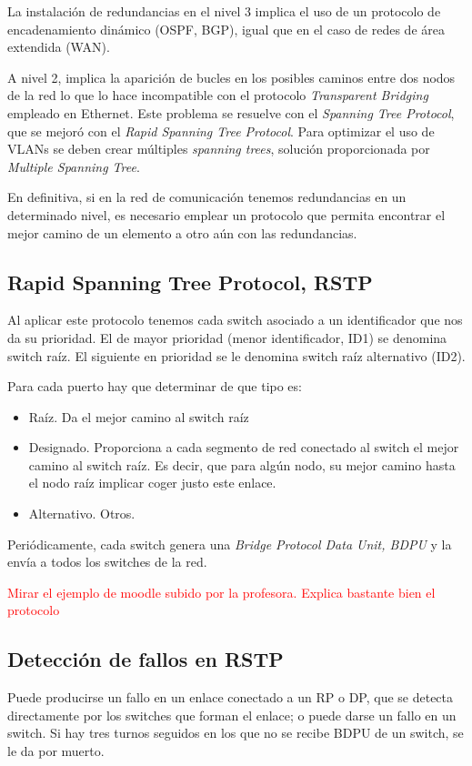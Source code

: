 La instalación de redundancias en el nivel 3 implica el uso de un protocolo de encadenamiento dinámico (OSPF, BGP), igual que en el caso de redes de área extendida (WAN).

A nivel 2, implica la aparición de bucles en los posibles caminos entre dos nodos de la red lo que lo hace incompatible con el protocolo \textit{Transparent Bridging} empleado en Ethernet. Este problema se resuelve con el \textit{Spanning Tree Protocol}, que se mejoró con el \textit{Rapid Spanning Tree Protocol}. Para optimizar el uso de VLANs se deben crear múltiples \textit{spanning trees}, solución proporcionada por \textit{Multiple Spanning Tree}.

En definitiva, si en la red de comunicación tenemos redundancias en un determinado nivel, es necesario emplear un protocolo que permita encontrar el mejor camino de un elemento a otro aún con las redundancias.

\subsection{Rapid Spanning Tree Protocol, RSTP}

Al aplicar este protocolo tenemos cada switch asociado a un identificador que nos da su prioridad. El de mayor prioridad (menor identificador, ID1) se denomina switch raíz. El siguiente en prioridad se le denomina switch raíz alternativo (ID2).

Para cada puerto hay que determinar de que tipo es:
\begin{itemize}
\item Raíz. Da el mejor camino al switch raíz

\item Designado. Proporciona a cada segmento de red conectado al switch el mejor camino al switch raíz. Es decir, que para algún nodo, su mejor camino hasta el nodo raíz implicar coger justo este enlace.

\item Alternativo. Otros.
\end{itemize}

Periódicamente, cada switch genera una \textit{Bridge Protocol Data Unit, BDPU} y la envía a todos los switches de la red.

\textcolor{red}{Mirar el ejemplo de moodle subido por la profesora. Explica bastante bien el protocolo}

\subsection{Detección de fallos en RSTP}
Puede producirse un fallo en un enlace conectado a un RP o DP, que se detecta directamente por los switches que forman el enlace; o puede darse un fallo en un switch. Si hay tres turnos seguidos en los que no se recibe BDPU de un switch, se le da por muerto.

